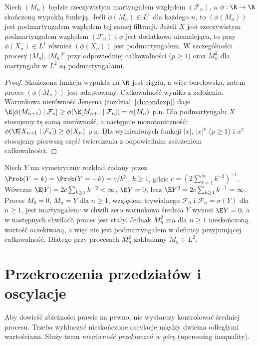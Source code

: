 \begin{twierdzenie}
Niech $(M_n)$ będzie rzeczywistym martyngałem
względem $(\mathcal F_n)$,
a $\phi:\R\to\R$ skończoną wypukłą funkcją.
Jeśli $\phi(M_n)\in L^1$ dla każdego $n$,
to $(\phi(M_n))$ jest podmartyngałem
względem tej samej filtracji.
Jeżeli $X$ jest rzeczywistym podmartyngałem
względem $(\mathcal F_n)$ i $\phi$ jest dodatkowo
niemalejąca, to przy
$\phi(X_n)\in L^1$ również $(\phi(X_n))$
jest podmartyngałem.
W szczególności procesy $|M_n|$, $|M_n|^p$
przy odpowiedniej całkowalności ($p\geq1$)
oraz $M_n^2$ dla martyngału w $L^2$
są podmartyngałami.
\end{twierdzenie}
\begin{proof}
Skończona funkcja wypukła na $\R$ jest ciągła,
a więc borelowska, zatem proces $(\phi(M_n))$
jest adaptowany. Całkowalność wynika z założenia.
Warunkowa nierówność Jensena
(rozdział~\ref{ch:condexp}) daje
$\E[\phi(M_{n+1})\mid\mathcal F_n]
\geq\phi(\E[M_{n+1}\mid\mathcal F_n])
=\phi(M_n)$ p.n.
Dla podmartyngału $X$ stosujemy tę samą
nierówność, a następnie monotoniczność:
$\phi(\E[X_{n+1}\mid\mathcal F_n])\geq\phi(X_n)$
p.n. Dla wymienionych funkcji $|x|$, $|x|^p$
($p\geq1$) i $x^2$ stosujemy pierwszą część
twierdzenia z odpowiednim założeniem całkowalności.
\end{proof}

\begin{przyklad}
Niech $Y$ ma symetryczny rozkład zadany przez
$\Prob(Y=k)=\Prob(Y=-k)=c/k^3$, $k\geq1$,
gdzie $c=(2\sum_{k=1}^\infty k^{-3})^{-1}$.
Wówczas $\E|Y|=2c\sum_{k\geq1}k^{-2}<\infty$,
$\E Y=0$, lecz $\E Y^2=2c\sum_{k\geq1}k^{-1}=\infty$.
Proces $M_0=0$, $M_n=Y$ dla $n\geq1$, względem
trywialnego $\mathcal F_0$ i $\mathcal F_n=\sigma(Y)$
dla $n\geq1$, jest martyngałem: w chwili zero
warunkowa średnia $Y$ wynosi $\E Y=0$,
a w następnych chwilach proces jest stały.
Jednak
$M_n^2$ ma dla $n\geq1$ nieskończoną wartość oczekiwaną,
a więc nie jest podmartyngałem w definicji
przyjmującej całkowalność. Dlatego przy procesach
$M_n^2$ zakładamy $M_n\in L^2$.
\end{przyklad}

\section{Przekroczenia przedziałów i oscylacje}

Aby dowieść zbieżności prawie na pewno, nie wystarczy
kontrolować średniej procesu. Trzeba wykluczyć
nieskończone oscylacje między dwiema odległymi
wartościami. Służy temu \emph{nierówność
przekroczeń w górę} (upcrossing inequality).

